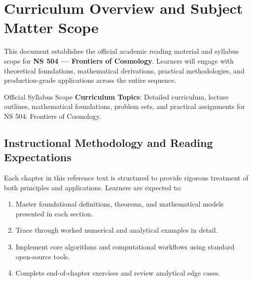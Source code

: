 \section{Curriculum Overview and Subject Matter Scope}

This document establishes the official academic reading material and syllabus scope for \textbf{NS 504 --- Frontiers of Cosmology}. Learners will engage with theoretical foundations, mathematical derivations, practical methodologies, and production-grade applications across the entire sequence.

\begin{InsightBox}{Official Syllabus Scope}
  \textbf{Curriculum Topics}: Detailed curriculum, lecture outlines, mathematical foundations, problem sets, and practical assignments for NS 504: Frontiers of Cosmology.
\end{InsightBox}

\subsection{Instructional Methodology and Reading Expectations}

Each chapter in this reference text is structured to provide rigorous treatment of both principles and applications. Learners are expected to:
\begin{enumerate}
  \item Master foundational definitions, theorems, and mathematical models presented in each section.
  \item Trace through worked numerical and analytical examples in detail.
  \item Implement core algorithms and computational workflows using standard open-source tools.
  \item Complete end-of-chapter exercises and review analytical edge cases.
\end{enumerate}

